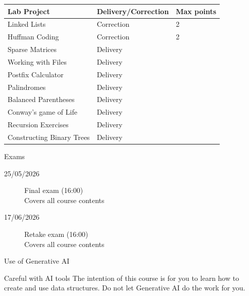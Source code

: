 \documentclass[11pt]{beamer}
\begin{document}
\begin{frame}
\begin{table}[h!btp]
\renewcommand{\arraystretch}{1.2}
\centering
\begin{tabular}{m{}@{\hskip 0.05\textwidth}m{}m{}}
\toprule
\textbf{Lab Project} & \textbf{Delivery/Correction} & \textbf{Max points} \\
\midrule
Linked Lists & Correction & 2 \\
Huffman Coding & Correction & 2 \\
\midrule
Sparse Matrices & Delivery &  \\
Working with Files & Delivery &  \\
Postfix Calculator & Delivery  &  \\
Palindromes & Delivery &  \\
Balanced Parentheses & Delivery &  \\
Conway's game of Life & Delivery & \\
Recursion Exercises & Delivery &  \\
Constructing Binary Trees & Delivery &  \\
\bottomrule
\end{tabular}
\end{table}
\end{frame}


\begin{frame}{Exams}
\begin{description}
\item[25/05/2026] Final exam (16:00) \\
Covers all course contents
\item[17/06/2026] Retake exam (16:00) \\
Covers all course contents
\end{description}
\end{frame}

\begin{frame}{Use of Generative AI}
\begin{alertblock}{Careful with AI tools}
The intention of this course is for you to learn how to create and use data structures. Do not let Generative AI do the work for you.
\end{alertblock}
\end{frame}
\end{document}
